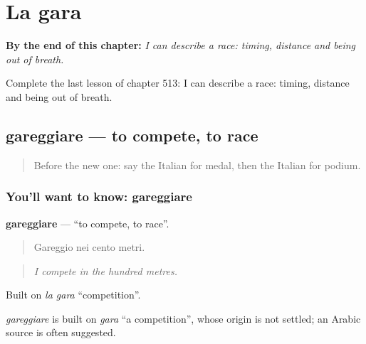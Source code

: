
\chapter{La gara}
\label{ch:it-la-gara}

\begin{chapteropening}
\textbf{By the end of this chapter:} \emph{I can describe a race: timing, distance and being out of breath.}

Complete the last lesson of chapter 513: I can describe a race: timing, distance and being out of breath.
\end{chapteropening}

\section[gareggiare]{gareggiare — to compete, to race}

\label{lesson:IT-C513-gareggiare}



\begin{quote}
Before the new one: say the Italian for medal, then the Italian for podium.
\end{quote}

\subsection*{You'll want to know: gareggiare}
\textbf{gareggiare} — \textquotedblleft{}to compete, to race\textquotedblright{}.

\begin{quote}
Gareggio nei cento metri.
\end{quote}

\begin{quote}
\emph{I compete in the hundred metres.}
\end{quote}

Built on \emph{la gara} \textquotedblleft{}competition\textquotedblright{}.

\begin{cousinweb}
\emph{gareggiare} is built on \emph{gara} \textquotedblleft{}a competition\textquotedblright{}, whose origin is not settled; an Arabic source is often suggested.
\end{cousinweb}

